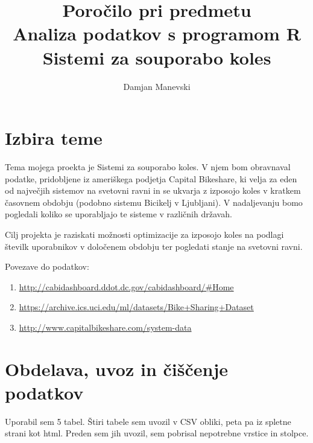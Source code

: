 \documentclass[11pt,a4paper]{article}
\begin{document}
\title{Poročilo pri predmetu \\
Analiza podatkov s programom R \\
Sistemi za souporabo koles}
\author{Damjan Manevski}
\maketitle

\section{Izbira teme}


  Tema mojega proekta je Sistemi za souporabo koles. V njem bom obravnaval podatke, pridobljene iz ameriškega podjetja Capital Bikeshare, ki velja za eden od največjih sistemov na svetovni ravni in se ukvarja z izposojo koles v kratkem časovnem obdobju (podobno sistemu Bicikelj v Ljubljani). V nadaljevanju bomo pogledali koliko se uporabljajo te sisteme v različnih državah. 
  
  Cilj projekta je raziskati možnosti optimizacije za izposojo koles na podlagi številk  uporabnikov v določenem obdobju ter pogledati stanje na svetovni ravni.
  
  Povezave do podatkov:
  
\begin{enumerate}

\item{\url{http://cabidashboard.ddot.dc.gov/cabidashboard/#Home}}

\item{\url{https://archive.ics.uci.edu/ml/datasets/Bike+Sharing+Dataset}}

\item{\url{http://www.capitalbikeshare.com/system-data}}

\end{enumerate}

\section{Obdelava, uvoz in čiščenje podatkov}

Uporabil sem 5 tabel. Štiri tabele sem uvozil v CSV obliki, peta pa iz spletne strani kot html. Preden sem jih uvozil, sem pobrisal nepotrebne vrstice in stolpce.
\end{document}
